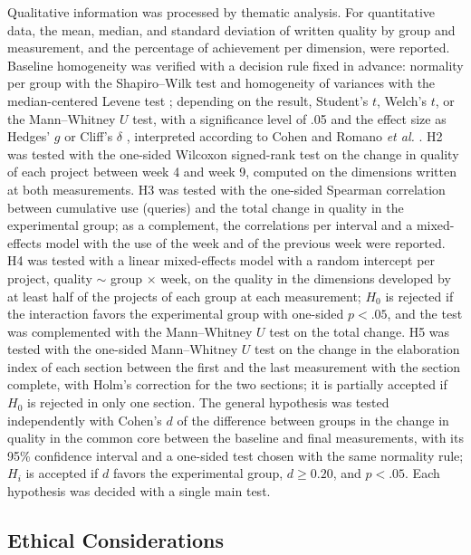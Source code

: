 \documentclass[journal]{IEEEtran}
\begin{document}
Qualitative information was processed by thematic analysis. For quantitative data, the mean, median, and standard deviation of written quality by group and measurement, and the percentage of achievement per dimension, were reported. Baseline homogeneity was verified with a decision rule fixed in advance: normality per group with the Shapiro--Wilk test \cite{shapiro1965} and homogeneity of variances with the median-centered Levene test \cite{brown1974}; depending on the result, Student's $t$, Welch's $t$, or the Mann--Whitney $U$ test, with a significance level of .05 and the effect size as Hedges' $g$ \cite{hedges1981} or Cliff's $\delta$ \cite{cliff1993}, interpreted according to Cohen \cite{cohen1988} and Romano \emph{et al.} \cite{romano2006}. H2 was tested with the one-sided Wilcoxon signed-rank test on the change in quality of each project between week 4 and week 9, computed on the dimensions written at both measurements. H3 was tested with the one-sided Spearman correlation between cumulative use (queries) and the total change in quality in the experimental group; as a complement, the correlations per interval and a mixed-effects model with the use of the week and of the previous week were reported. H4 was tested with a linear mixed-effects model with a random intercept per project, quality $\sim$ group $\times$ week, on the quality in the dimensions developed by at least half of the projects of each group at each measurement; $H_0$ is rejected if the interaction favors the experimental group with one-sided $p < .05$, and the test was complemented with the Mann--Whitney $U$ test on the total change. H5 was tested with the one-sided Mann--Whitney $U$ test on the change in the elaboration index of each section between the first and the last measurement with the section complete, with Holm's correction \cite{holm1979} for the two sections; it is partially accepted if $H_0$ is rejected in only one section. The general hypothesis was tested independently with Cohen's $d$ \cite{cohen1988} of the difference between groups in the change in quality in the common core between the baseline and final measurements, with its 95\% confidence interval and a one-sided test chosen with the same normality rule; $H_i$ is accepted if $d$ favors the experimental group, $d \geq 0.20$, and $p < .05$. Each hypothesis was decided with a single main test.

\subsection{Ethical Considerations}
\end{document}
